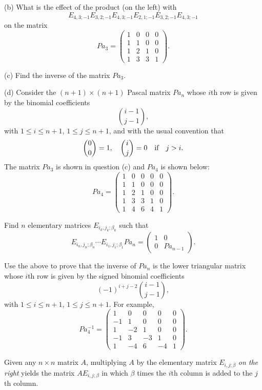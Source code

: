 \documentclass[12pt]{article}
\begin{document}
\medskip
(b)
What is the effect of the product (on the left) with
\[
E_{4, 3; -1} E_{3, 2; -1} E_{4, 3; -1} E_{2, 1; -1} E_{3, 2; -1} E_{4, 3; -1}
\]
on the matrix 
\[
Pa_3 = 
\begin{pmatrix}
1 & 0 & 0 & 0 \\
1 & 1 & 0 & 0 \\
1 & 2 & 1 & 0 \\
1 & 3 & 3 & 1
\end{pmatrix}.
\]

\medskip
(c)
Find the inverse of the matrix $Pa_3$.

\medskip
(d)
Consider the $(n+1)\times (n+1)$ Pascal matrix $Pa_{n}$
whose $i$th row is given by the binomial coefficients
\[
\binom{i-1}{j-1},
\]
with $1 \leq i \leq n + 1$, $1 \leq j \leq n + 1$,
and with the usual convention that
\[
\binom{0}{0} = 1, \quad \binom{i}{j} = 0 
\quad\hbox{if}\quad j > i.
\]
The matrix $Pa_3$ is shown in question (c) and $Pa_4$ is shown below:
\[
Pa_4 = 
\begin{pmatrix}
1 & 0 & 0 & 0 & 0\\
1 & 1 & 0 & 0 & 0 \\
1 & 2 & 1 & 0 & 0 \\
1 & 3 & 3 & 1 & 0 \\
1 & 4 & 6 & 4 & 1
\end{pmatrix}.
\]

Find $n$ elementary matrices $E_{i_k, j_k; \beta_k}$ such that
\[
E_{i_n, j_n; \beta_n} \cdots E_{i_1, j_1; \beta_1} Pa_n = 
\begin{pmatrix}
1 & 0 \\
0 & Pa_{n - 1}
\end{pmatrix}.
\]

Use the above to prove that the inverse of $Pa_n$ is the lower
triangular matrix whose $i$th row is given by the signed binomial
coefficients
\[
(-1)^{i + j - 2}\binom{i-1}{j-1},
\]
with $1 \leq i \leq n + 1$, $1 \leq j \leq n + 1$.
For example,
\[
Pa_4^{-1} = 
\begin{pmatrix}
1 & 0 & 0 & 0 & 0\\
-1 & 1 & 0 & 0 & 0 \\
1 & -2 & 1 & 0 & 0 \\
-1 & 3 & -3 & 1 & 0 \\
1 & -4 & 6 & -4 & 1
\end{pmatrix}.
\]

\hint
Given any $n\times n$ matrix $A$, 
multiplying $A$ by the elementary matrix
$E_{i, j; \beta}$ {\it on the right\/} yields
the matrix $AE_{i, j; \beta}$ in which $\beta$ times the  $i$th column is
added to the $j$th column.
\end{document}
